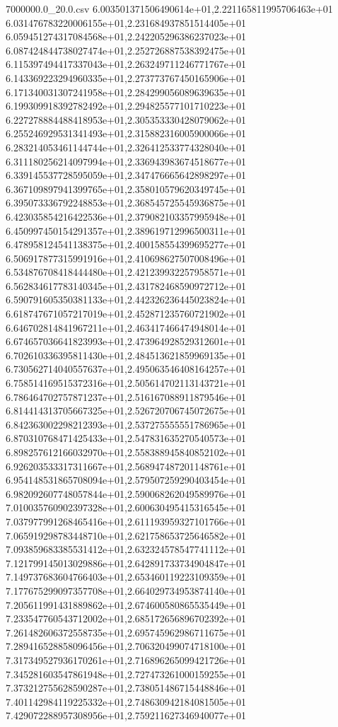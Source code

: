 \begin{filecontents*}{7000000.0_20.0.csv}
6.003501371506490614e+01,2.221165811995706463e+01
6.031476783220006155e+01,2.231684937851514405e+01
6.059451274317084568e+01,2.242205296386237023e+01
6.087424844738027474e+01,2.252726887538392475e+01
6.115397494417337043e+01,2.263249711246771767e+01
6.143369223294960335e+01,2.273773767450165906e+01
6.171340031307241958e+01,2.284299056089639635e+01
6.199309918392782492e+01,2.294825577101710223e+01
6.227278884488418953e+01,2.305353330428079062e+01
6.255246929531341493e+01,2.315882316005900066e+01
6.283214053461144744e+01,2.326412533774328040e+01
6.311180256214097994e+01,2.336943983674518677e+01
6.339145537728595059e+01,2.347476665642898297e+01
6.367109897941399765e+01,2.358010579620349745e+01
6.395073336792248853e+01,2.368545725545936875e+01
6.423035854216422536e+01,2.379082103357995948e+01
6.450997450154291357e+01,2.389619712996500311e+01
6.478958124541138375e+01,2.400158554399695277e+01
6.506917877315991916e+01,2.410698627507008496e+01
6.534876708418444480e+01,2.421239932257958571e+01
6.562834617783140345e+01,2.431782468590972712e+01
6.590791605350381133e+01,2.442326236445023824e+01
6.618747671057217019e+01,2.452871235760721902e+01
6.646702814841967211e+01,2.463417466474948014e+01
6.674657036641823993e+01,2.473964928529312601e+01
6.702610336395811430e+01,2.484513621859969135e+01
6.730562714040557637e+01,2.495063546408164257e+01
6.758514169515372316e+01,2.505614702113143721e+01
6.786464702757871237e+01,2.516167088911879546e+01
6.814414313705667325e+01,2.526720706745072675e+01
6.842363002298212393e+01,2.537275555551786965e+01
6.870310768471425433e+01,2.547831635270540573e+01
6.898257612166032970e+01,2.558388945840852102e+01
6.926203533317311667e+01,2.568947487201148761e+01
6.954148531865708094e+01,2.579507259290403454e+01
6.982092607748057844e+01,2.590068262049589976e+01
7.010035760902397328e+01,2.600630495415316545e+01
7.037977991268465416e+01,2.611193959327101766e+01
7.065919298783448710e+01,2.621758653725646582e+01
7.093859683385531412e+01,2.632324578547741112e+01
7.121799145013029886e+01,2.642891733734904847e+01
7.149737683604766403e+01,2.653460119223109359e+01
7.177675299097357708e+01,2.664029734953874140e+01
7.205611991431889862e+01,2.674600580865535449e+01
7.233547760543712002e+01,2.685172656896702392e+01
7.261482606372558735e+01,2.695745962986711675e+01
7.289416528858096456e+01,2.706320499074718100e+01
7.317349527936170261e+01,2.716896265099421726e+01
7.345281603547861948e+01,2.727473261000159255e+01
7.373212755628590287e+01,2.738051486715448846e+01
7.401142984119225332e+01,2.748630942184081505e+01
7.429072288957308956e+01,2.759211627346940077e+01

\end{filecontents*}
